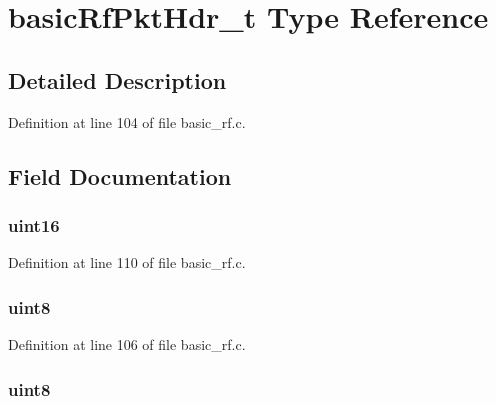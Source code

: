 \hypertarget{typebasic_rf_pkt_hdr__t}{
\section{basicRfPktHdr\_\-t Type Reference}
\label{typebasic_rf_pkt_hdr__t}
}
\par
\par


\subsection{Detailed Description}


Definition at line 104 of file basic\_\-rf.c.



\subsection{Field Documentation}
\hypertarget{typebasic_rf_pkt_hdr__t_a716ebc94fe084f04cfae199eba9fd07f}{
\subsubsection[{destAddr}]{ {\bfseries uint16 } }}
\label{typebasic_rf_pkt_hdr__t_a716ebc94fe084f04cfae199eba9fd07f}


Definition at line 110 of file basic\_\-rf.c.

\hypertarget{typebasic_rf_pkt_hdr__t_af22a911d117d2be60d0605335ce2ec11}{
\subsubsection[{fcf0}]{ {\bfseries uint8 } }}
\label{typebasic_rf_pkt_hdr__t_af22a911d117d2be60d0605335ce2ec11}


Definition at line 106 of file basic\_\-rf.c.

\hypertarget{typebasic_rf_pkt_hdr__t_a4db5fc2b974095a2231b1c0ba4fe7e69}{
\subsubsection[{fcf1}]{ {\bfseries uint8 } }}
\label{typebasic_rf_pkt_hdr__t_a4db5fc2b974095a2231b1c0ba4fe7e69}



